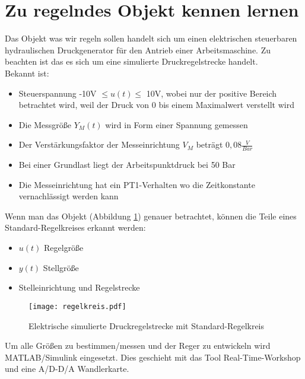 
\newpage
[Hansert]
\section{Zu regelndes Objekt kennen lernen}
Das Objekt was wir regeln sollen handelt sich um einen elektrischen steuerbaren hydraulischen Druckgenerator für den Antrieb einer Arbeitsmaschine. Zu beachten ist das es sich um eine simulierte Druckregelstrecke handelt.\\

Bekannt ist:
\begin{itemize}
\item Steuerspannung -10V $\leq u(t) \leq$ 10V, wobei nur der positive Bereich betrachtet wird, weil der Druck von 0 bis einem Maximalwert verstellt wird

\item Die Messgröße $Y_{M}(t)$ wird in Form einer Spannung gemessen

\item Der Verstärkungsfaktor der Messeinrichtung $V_{M}$ beträgt $0,08\frac{V}{Bar}$

\item Bei einer Grundlast liegt der Arbeitspunktdruck bei 50 Bar

\item Die Messeinrichtung hat ein PT1-Verhalten wo die Zeitkonstante vernachlässigt werden kann 
\end{itemize}


Wenn man das Objekt (Abbildung \ref{RegelKreis}) genauer betrachtet, können die Teile eines Standard-Regelkreises erkannt werden:
\begin{itemize}
\item $u(t)$ Regelgröße
\item $y(t)$ Stellgröße
\item Stelleinrichtung und Regelstrecke
\end{itemize}

\begin{figure}[htbp]
	\begin{center}
		\texttt{[image: regelkreis.pdf]}
		\caption{Elektrische simulierte Druckregelstrecke mit Standard-Regelkreis}
       \label{RegelKreis}
	\end{center} 
\end{figure}

\newpage

Um alle Größen zu bestimmen/messen und der Reger zu entwickeln wird MATLAB/Simulink eingesetzt. Dies geschieht mit das Tool Real-Time-Workshop und eine A/D-D/A Wandlerkarte.



